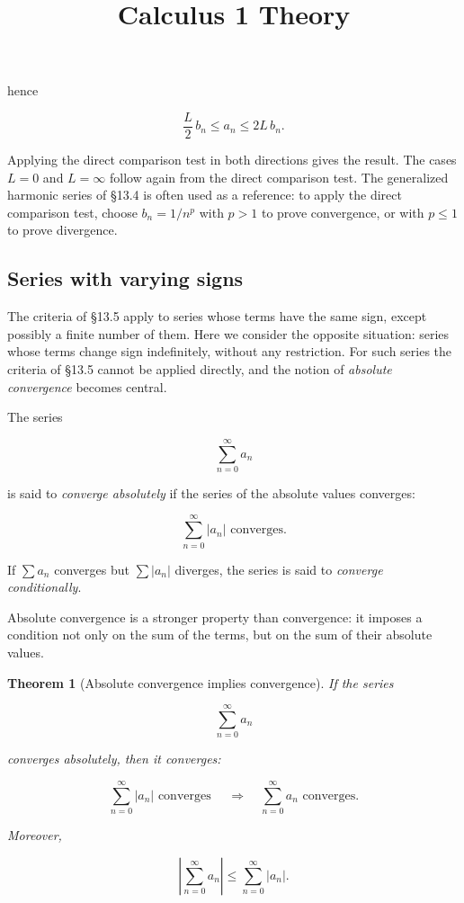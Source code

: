 \documentclass[11pt,a4paper]{article} \usepackage[T1]{fontenc}
\theoremstyle{plain} \newtheorem{theorem}{Theorem} \title{Calculus 1 Theory}
\begin{document}
hence

\[
\frac{L}{2}\, b_n \le a_n \le 2L\, b_n.
\]

Applying the direct comparison test in both directions gives the result. The
cases $L=0$ and $L=\infty$ follow again from the direct comparison test. The
generalized harmonic series of \S 13.4 is often used as a reference: to apply
the direct comparison test, choose $b_n = 1/n^p$ with $p>1$ to prove
convergence, or with $p\le 1$ to prove divergence.

\subsection {Series with varying signs}

The criteria of \S 13.5 apply to series whose terms have the same sign, except
possibly a finite number of them. Here we consider the opposite situation:
series whose terms change sign indefinitely, without any restriction. For such
series the criteria of \S 13.5 cannot be applied directly, and the notion of
\emph{absolute convergence} becomes central.

\begin{definition}
 The series

\[
\sum_{n=0}^{\infty} a_n
\]

is said to \emph{converge absolutely} if the series of the absolute values
converges:

\[
\sum_{n=0}^{\infty} |a_n| \text{ converges}.
\]

If $\sum a_n$ converges but $\sum |a_n|$ diverges, the series is said to
\emph{converge conditionally}.
\end{definition}

Absolute convergence is a stronger property than convergence: it imposes a
condition not only on the sum of the terms, but on the sum of their absolute
values.

\begin{theorem}
[Absolute convergence implies convergence] If the series

\[
\sum_{n=0}^{\infty} a_n
\]

converges absolutely, then it converges:

\[
\sum_{n=0}^{\infty} |a_n| \text{ converges } \quad\Longrightarrow\quad \sum_{n=0}^{\infty} a_n \text{ converges}.
\]

Moreover,

\[
\left|\sum_{n=0}^{\infty} a_n\right| \le \sum_{n=0}^{\infty} |a_n|.
\]

\end{theorem}
\end{document}
